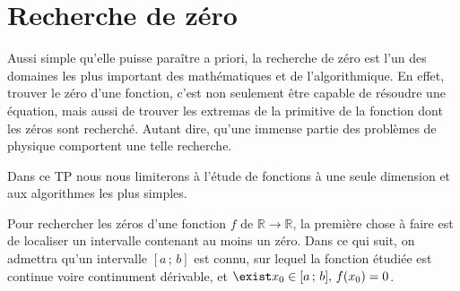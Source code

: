 \section{Recherche de zéro}
Aussi simple qu'elle puisse paraître a priori, la recherche de zéro est
l'un des domaines les plus important des mathématiques et de l'algorithmique. 
En effet, trouver le zéro d'une fonction, c'est non seulement 
être capable de résoudre une équation, mais aussi de trouver 
les extremas de la primitive de la fonction dont les zéros sont recherché. 
Autant dire, qu'une immense partie des problèmes de physique comportent 
une telle recherche.

Dans ce TP nous nous limiterons à l'étude de fonctions à une seule dimension et aux algorithmes les plus simples. 

Pour rechercher les zéros d'une 
fonction $f$ de $\mathbb{R}  \longrightarrow  \mathbb{R}$, 
la première chose à faire est  de localiser un intervalle contenant 
au moins un zéro. Dans ce qui suit, on admettra qu'un intervalle $[a\,;\,b]$
est connu, sur lequel la fonction étudiée est continue voire continument dérivable, et $\exist x_0 \in  [a\,;\,b], \, f(x_0)=0$.

